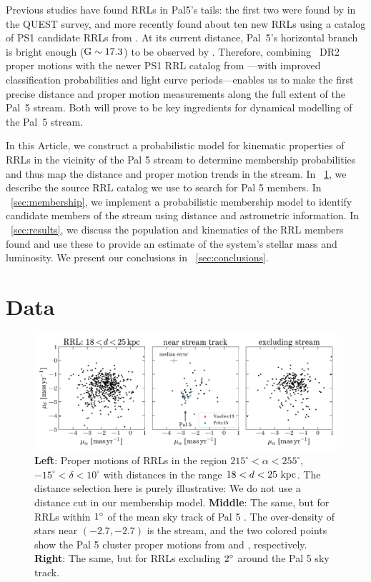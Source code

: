 \documentclass[twocolumn]{aastex63}
\begin{document}
Previous studies have found RRLs in Pal5's tails: the first two were found by \citet{Vivas:2001} in the QUEST survey, and more recently \citep{Ibata:2017} found about ten new RRLs using a catalog of PS1 candidate RRLs from \citet{Hernitschek:2016}. At its current distance, Pal~5's horizontal branch is bright enough (${\mathrm{G}}\sim17.3$) to be observed by \Gaia. Therefore, combining \Gaia~DR2 proper motions with the newer PS1 RRL catalog from \citet{Sesar:2017b}---with improved classification probabilities and light curve periods---enables us to make the first precise distance and proper motion measurements along the full extent of the Pal~5 stream. Both will prove to be key ingredients for dynamical modelling of the Pal~5 stream.

In this Article, we construct a probabilistic model for kinematic properties of RRLs in the vicinity of the Pal 5 stream to determine membership probabilities and thus map the distance and proper motion trends in the stream.
In \sectionname~\ref{sec:data}, we describe the source RRL catalog we use to search for Pal 5 members.
In \sectionname~\ref{sec:membership}, we implement a probabilistic membership model to identify candidate members of the stream using distance and astrometric information.
In \sectionname~\ref{sec:results}, we discuss the population and kinematics of the RRL members found and use these to provide an estimate of the system's stellar mass and luminosity.
We present our conclusions in \sectionname~\ref{sec:conclusions}.

\section{Data} \label{sec:data}

\begin{figure}[t!]
\begin{center}
\includegraphics[width=\textwidth]{proper-motion.pdf}
\caption{\textbf{Left}: Proper motions of RRLs in the region $215^\circ < \alpha < 255^\circ$, $-15^\circ < \delta < 10^\circ$ with distances in the range $18 < d < 25~\mathrm{kpc}$.
The distance selection here is purely illustrative: We do not use a distance cut in our membership model.
\textbf{Middle}: The same, but for RRLs within $1\mbox{$^\circ$}$ of the mean sky track of Pal 5 \citep{Bonaca:2019}.
The over-density of stars near $(-2.7, -2.7)$ is the stream, and the two colored points show the Pal 5 cluster proper motions from \citet{Vasiliev:2019} and \citet{Fritz:2015}, respectively.
\textbf{Right}: The same, but for RRLs excluding $2\mbox{$^\circ$}$ around the Pal 5 sky track.}
\label{fig:pm}
\end{center}
\end{figure}
\end{document}
